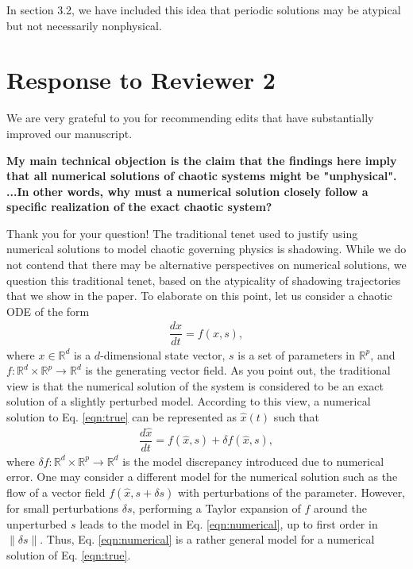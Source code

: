 \documentclass[11pt]{article}
\newcommand{\reviewerTwo}[1]{{\color{azure}\textbf{#1}}}
\begin{document}
In section 3.2, we have included this idea that periodic solutions may be atypical but not necessarily nonphysical.

\section*{Response to Reviewer 2}
We are very grateful to you for recommending edits that have substantially improved our manuscript.

\reviewerTwo{My main technical objection is the claim that the findings here imply that all numerical solutions of chaotic systems might be "unphysical". ...In other words, why must a numerical solution closely follow a specific realization of the exact chaotic system? }

Thank you for your question! The traditional tenet used to justify using numerical solutions to model chaotic governing physics is shadowing. While we do not contend that there may be alternative perspectives on numerical solutions, we question this traditional tenet, based on the atypicality of shadowing trajectories that we show in the paper. To elaborate on this point, let us consider a chaotic ODE of the form 
\begin{align}
\label{eqn:true}
    \dfrac{d x}{dt} = f(x, s),
\end{align}
where $x \in \mathbb{R}^d$ is a $d$-dimensional state vector, $s$ is a set of
parameters in $\mathbb{R}^p$, and $f:\mathbb{R}^d \times \mathbb{R}^p \to \mathbb{R}^d$ is the generating vector field. As you point out, the traditional view is that the numerical solution of the system is considered to be an exact solution of a slightly perturbed model. According to this view, a numerical solution to Eq. \ref{eqn:true} can be represented as $\hat{x}(t)$ such that 
\begin{align}
\label{eqn:numerical}
    \dfrac{d\hat{x}}{dt} = f(\hat{x}, s) + \delta f(\hat{x},s), 
\end{align}
where $\delta f:\mathbb{R}^d \times \mathbb{R}^p \to \mathbb{R}^d$ is the model discrepancy introduced due to numerical error. One may consider a different model for the numerical solution such as the flow of a vector field $f(\hat{x}, s + \delta s)$ with perturbations of the parameter. However, for small perturbations $\delta s$, performing a Taylor expansion of $f$ around the unperturbed $s$ leads to the model in Eq. \ref{eqn:numerical}, up to first order in $\|\delta s\|$. Thus, Eq. \ref{eqn:numerical} is a rather general model for a numerical solution of Eq. \ref{eqn:true}.
\end{document}
